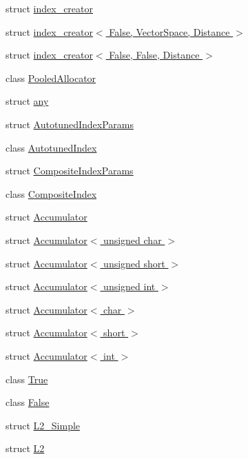 \begin{DoxyCompactItemize}
\item 
struct \hyperlink{structcvflann_1_1index__creator}{index\-\_\-creator}
\item 
struct \hyperlink{structcvflann_1_1index__creator_3_01False_00_01VectorSpace_00_01Distance_01_4}{index\-\_\-creator$<$ False, Vector\-Space, Distance $>$}
\item 
struct \hyperlink{structcvflann_1_1index__creator_3_01False_00_01False_00_01Distance_01_4}{index\-\_\-creator$<$ False, False, Distance $>$}
\item 
class \hyperlink{classcvflann_1_1PooledAllocator}{Pooled\-Allocator}
\item 
struct \hyperlink{structcvflann_1_1any}{any}
\item 
struct \hyperlink{structcvflann_1_1AutotunedIndexParams}{Autotuned\-Index\-Params}
\item 
class \hyperlink{classcvflann_1_1AutotunedIndex}{Autotuned\-Index}
\item 
struct \hyperlink{structcvflann_1_1CompositeIndexParams}{Composite\-Index\-Params}
\item 
class \hyperlink{classcvflann_1_1CompositeIndex}{Composite\-Index}
\item 
struct \hyperlink{structcvflann_1_1Accumulator}{Accumulator}
\item 
struct \hyperlink{structcvflann_1_1Accumulator_3_01unsigned_01char_01_4}{Accumulator$<$ unsigned char $>$}
\item 
struct \hyperlink{structcvflann_1_1Accumulator_3_01unsigned_01short_01_4}{Accumulator$<$ unsigned short $>$}
\item 
struct \hyperlink{structcvflann_1_1Accumulator_3_01unsigned_01int_01_4}{Accumulator$<$ unsigned int $>$}
\item 
struct \hyperlink{structcvflann_1_1Accumulator_3_01char_01_4}{Accumulator$<$ char $>$}
\item 
struct \hyperlink{structcvflann_1_1Accumulator_3_01short_01_4}{Accumulator$<$ short $>$}
\item 
struct \hyperlink{structcvflann_1_1Accumulator_3_01int_01_4}{Accumulator$<$ int $>$}
\item 
class \hyperlink{classcvflann_1_1True}{True}
\item 
class \hyperlink{classcvflann_1_1False}{False}
\item 
struct \hyperlink{structcvflann_1_1L2__Simple}{L2\-\_\-\-Simple}
\item 
struct \hyperlink{structcvflann_1_1L2}{L2}

\end{DoxyCompactItemize}
